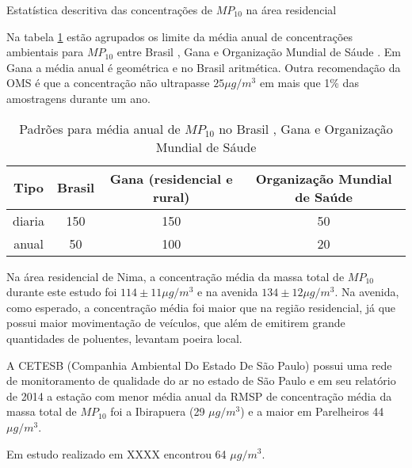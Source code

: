 \begin{table}[H]
  \centering
    
  \caption{Estatística descritiva das concentrações de  $MP_{10}$ na área 
           residencial \label{table:RIcH_descriptive}}
\end{table}

Na tabela \ref{table:pm10standards} estão agrupados os limite da média anual de 
concentrações ambientais para $MP_{10}$ entre Brasil \citep{conama1990}, 
Gana \citep{epa2015} e Organização Mundial de Sáude \citep{who}. 
Em Gana a média anual é geométrica e no Brasil aritmética.
Outra recomendação da OMS é que a concentração não ultrapasse $25 \mu g/m^3$ 
em mais que 1\% das amostragens durante um ano. 

\begin{table}[H]
  \centering
      \begin{tabular}{cccc}
     \hline
   Tipo & Brasil & Gana (residencial e rural) & Organização Mundial de Saúde \\
     \hline
   diaria & 150 & 150 &  50 \\
     anual &  50 & 100 &  20 \\
      \hline
  \end{tabular}
  \caption{Padrões para média anual de $MP_{10}$ no Brasil \citep{conama1990}, 
           Gana \citep{epa2015} e 
           Organização Mundial de Sáude \citep{who}
           \label{table:pm10standards}}
\end{table}

Na área residencial de Nima, a concentração média da massa total de $MP_{10}$ 
durante este estudo foi $114\pm 11 \mu g / m^3$ e na avenida 
$134\pm 12 \mu g / m^3$. Na avenida, como esperado, a concentração média 
foi maior que na região residencial, já que possui maior movimentação de 
veículos, que além de emitirem grande quantidades de poluentes, levantam 
poeira local. 

A CETESB (Companhia Ambiental Do Estado De São Paulo) possui uma rede de 
monitoramento de qualidade do ar no estado de São Paulo e em seu relatório 
de 2014 \citep{cetesb2014} a estação com menor média anual da RMSP 
de concentração média da massa total de $MP_{10}$ foi a Ibirapuera 
(29 $\mu g / m^3$) e a maior em Parelheiros 44 $\mu g / m^3$.  

Em estudo realizado em XXXX \cite{souza2014} encontrou 64 $\mu g / m^3$.

